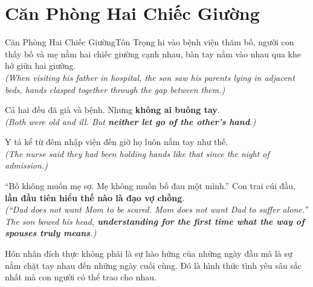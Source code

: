 \section{Căn Phòng Hai Chiếc Giường}
\begin{truyen}{Căn Phòng Hai Chiếc Giường}{Tôn Trọng}
hi vào bệnh viện thăm bố, người con thấy bố và mẹ nằm hai chiếc giường cạnh nhau, bàn tay nắm vào nhau qua khe hở giữa hai giường.\\
\textit{(When visiting his father in hospital, the son saw his parents lying in adjacent beds, hands clasped together through the gap between them.)}

Cả hai đều đã già và bệnh. Nhưng \textbf{không ai buông tay}.\\
\textit{(Both were old and ill. But \textbf{neither let go of the other's hand}.)}

Y tá kể từ đêm nhập viện đến giờ họ luôn nắm tay như thế.\\
\textit{(The nurse said they had been holding hands like that since the night of admission.)}

``Bố không muốn mẹ sợ. Mẹ không muốn bố đau một mình.'' Con trai cúi đầu, \textbf{lần đầu tiên hiểu thế nào là đạo vợ chồng}.\\
\textit{(``Dad does not want Mom to be scared. Mom does not want Dad to suffer alone.'' The son bowed his head, \textbf{understanding for the first time what the way of spouses truly means}.)}
\end{truyen}
\begin{baihoc}
  Hôn nhân đích thực không phải là sự hào hứng của những ngày đầu mà là sự nắm chặt tay nhau đến những ngày cuối cùng. Đó là hình thức tình yêu sâu sắc nhất mà con người có thể trao cho nhau.
\end{baihoc}

